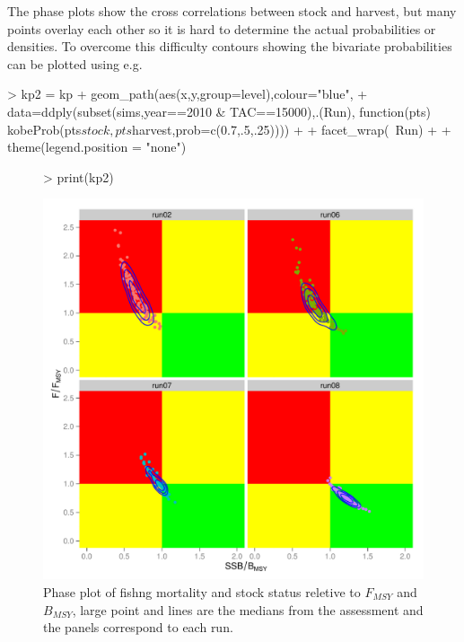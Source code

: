 \documentclass[shortnames,nojss,article]{jss}
\begin{document}
The phase plots show the cross correlations between stock and harvest, but many points overlay each other so it is hard
to determine the actual probabilities or densities. To overcome this difficulty contours showing the bivariate probabilities 
can be plotted using  e.g.

\begin{Schunk}
\begin{Sinput}
> kp2 = kp + geom_path(aes(x,y,group=level),colour="blue",
+                     data=ddply(subset(sims,year==2010 & TAC==15000),.(Run), function(pts) kobeProb(pts$stock,pts$harvest,prob=c(0.7,.5,.25)))) +
+                     facet_wrap(~Run) + 
+                     theme(legend.position = "none")
\end{Sinput}
\end{Schunk}

\begin{figure}\begin{center}
\begin{Schunk}
\begin{Sinput}
> print(kp2)
\end{Sinput}
\end{Schunk}
\includegraphics{kobe-020}
\caption{Phase plot of fishng mortality and stock status reletive to $F_{MSY}$ and  $B_{MSY}$, large point and lines are the medians
from the assessment and the panels correspond to  each run.}
\end{center}\end{figure}
\end{document}
